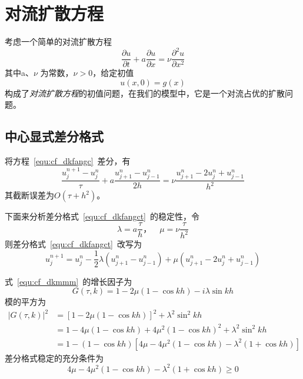 \section{对流扩散方程}
考虑一个简单的对流扩散方程
\begin{equation}\label{equ:cf_dkfangc}
	\dfrac{\partial u}{\partial t}+a\dfrac{\partial u}{\partial x}=\nu\dfrac{\partial^2 u}{\partial x^2}
\end{equation}
其中a、$\nu$ 为常数，$\nu>0$，给定初值
\begin{equation}
	u(x,0)=g(x)
\end{equation}
构成了\emph{对流扩散方程}的初值问题，在我们的模型中，它是一个对流占优的扩散问题。\par
\subsection{中心显式差分格式}
将方程~\eqref{equ:cf_dkfangc}~差分，有
\begin{equation}\label{equ:cf_dkfangct}
	\dfrac{u^{n+1}_j-u^{n}_{j}}{\tau}+a\dfrac{u^{n}_{j+1}-u^n_{j-1}}{2h}=\nu\dfrac{u^n_{j+1}-2u^n_j+u^n_{j-1}}{h^2}
\end{equation}
其截断误差为$O(\tau+h^2)$。\par
下面来分析差分格式~\eqref{equ:cf_dkfangct}~的稳定性，令
\begin{equation}
	\lambda = a\dfrac{\tau}{h}，\quad\mu=\nu\dfrac{\tau}{h^2}
\end{equation}
则差分格式~\eqref{equ:cf_dkfangct}~改写为
\begin{equation}\label{equ:cf_dkmmm}
u^{n+1}_j=u^n_j-\frac{1}{2}\lambda(u^n_{j+1}-u^n_{j-1})+\mu(u^n_{j+1}-2u^n_j+u^n_{j-1})
\end{equation}\par
式~\eqref{equ:cf_dkmmm}~的增长因子为
\begin{equation}
	G(\tau,k)=1-2\mu(1-\cos kh)-i\lambda\sin kh
\end{equation}
模的平方为
\begin{equation}
\begin{aligned}
	|G(\tau,k)|^2 &= [1-2\mu(1-\cos kh)]^2+\lambda^2\sin^2 kh\\
				  &= 1-4\mu(1-\cos kh)+4\mu^2(1-\cos kh)^2+\lambda^2\sin^2 kh\\
				  &= 1-(1-\cos kh)[4\mu-4\mu^2(1-\cos kh)-\lambda^2(1+\cos kh)]
\end{aligned}				  
\end{equation}
差分格式稳定的充分条件为
\begin{equation}
4\mu-4\mu^2(1-\cos kh)-\lambda^2(1+\cos kh) \geq 0
\end{equation}
